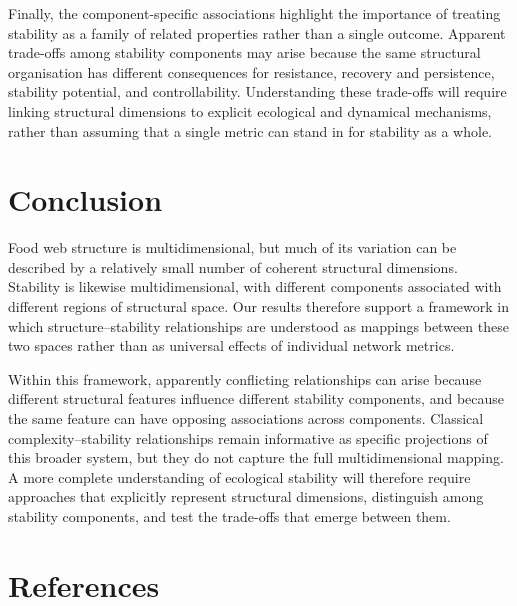\documentclass[
]{article}
\begin{document}
Finally, the component-specific associations highlight the importance of
treating stability as a family of related properties rather than a
single outcome. Apparent trade-offs among stability components may arise
because the same structural organisation has different consequences for
resistance, recovery and persistence, stability potential, and
controllability. Understanding these trade-offs will require linking
structural dimensions to explicit ecological and dynamical mechanisms,
rather than assuming that a single metric can stand in for stability as
a whole.

\section{Conclusion}\label{conclusion}

Food web structure is multidimensional, but much of its variation can be
described by a relatively small number of coherent structural
dimensions. Stability is likewise multidimensional, with different
components associated with different regions of structural space. Our
results therefore support a framework in which structure--stability
relationships are understood as mappings between these two spaces rather
than as universal effects of individual network metrics.

Within this framework, apparently conflicting relationships can arise
because different structural features influence different stability
components, and because the same feature can have opposing associations
across components. Classical complexity--stability relationships remain
informative as specific projections of this broader system, but they do
not capture the full multidimensional mapping. A more complete
understanding of ecological stability will therefore require approaches
that explicitly represent structural dimensions, distinguish among
stability components, and test the trade-offs that emerge between them.

\section*{References}\label{references}
\end{document}
